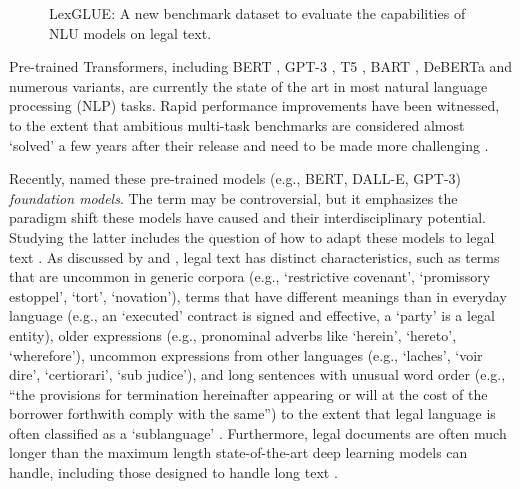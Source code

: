 \documentclass[11pt]{article}
\begin{document}
\begin{figure}[t]
    \centering
    \vspace*{-7mm}
    \caption{LexGLUE: A new benchmark dataset to evaluate the capabilities of NLU models on legal text.
    }
    \label{fig:my_label}
    \vspace{-5mm}
\end{figure}


Pre-trained Transformers, including BERT \cite{devlin-etal-2019-bert}, GPT-3 \cite{brown2020language}, T5 \cite{JMLR:v21:20-074}, BART \cite{lewis-etal-2020-bart}, DeBERTa \cite{he2021deberta} and numerous variants, are currently the state of the art in most natural language processing (NLP) tasks. Rapid performance improvements have been witnessed, to the extent that ambitious multi-task benchmarks  \cite{wang-2018-glue,wang-2019-glue} are considered almost `solved' a few years after their release and  need to be made more challenging \cite{wang-2019-superglue}. 

Recently, \citet{bommasani2021opportunities} named these pre-trained models (e.g., BERT, DALL-E, GPT-3) \emph{foundation models}. The term may be controversial, but it emphasizes the paradigm shift these models have caused and their interdisciplinary potential. Studying the latter includes the question of how to adapt these models to legal text \cite{bommarito2021Lex}. As discussed by \citet{zhong2020does} and \citet{chalkidis-etal-2020-legalbert}, legal text has distinct characteristics, such as terms that are uncommon in generic corpora (e.g., ‘restrictive covenant’, ‘promissory estoppel’, ‘tort’, ‘novation’), terms that have different meanings than in everyday language (e.g., an ‘executed’ contract is signed and effective, a `party' is a legal entity), older expressions (e.g., pronominal adverbs like ‘herein’, ‘hereto’, ‘wherefore’), uncommon expressions from other languages (e.g., ‘laches’, ‘voir dire’, ‘certiorari’, ‘sub judice’), and long sentences with unusual word order (e.g., ``the provisions for termination hereinafter appearing or will at the cost of the borrower forthwith comply with the same'') to the extent that legal language is often classified as a `sublanguage' \citep{Tiersma1999,Williams2007,Haigh2018}. Furthermore, legal documents are often much longer than the maximum length state-of-the-art deep learning models can handle, including those designed to handle long text \cite{Longformer,BigBird,yang-etal-2020-smith}. 
\end{document}
